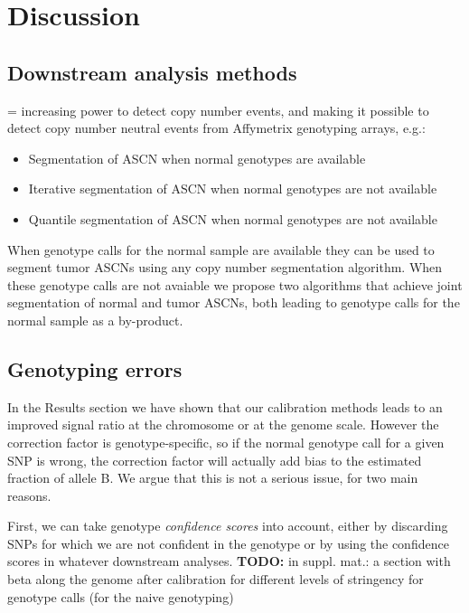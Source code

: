 \documentclass[10pt]{bmc_article}
\newenvironment{bmcformat}{\fussy\setboolean{publ}{true}}{\fussy}
\newenvironment{TODO}{\color{red}\textbf{TODO:}}{}
\begin{document}
\begin{bmcformat}
\section*{Discussion}

\subsection*{Downstream analysis methods}
= increasing power to detect copy number events, and making it possible to detect copy number neutral events from Affymetrix genotyping arrays, e.g.: 
\begin{itemize}
\item Segmentation of ASCN when normal genotypes are available
\item Iterative segmentation of ASCN when normal genotypes are not available
\item Quantile segmentation of ASCN when normal genotypes are not available
\end{itemize}

 When genotype calls for the normal sample are available they can be used to segment tumor ASCNs using any copy number segmentation algorithm. When these genotype calls are not avaiable we propose two algorithms that achieve joint segmentation of normal and tumor ASCNs, both leading to genotype calls for the normal sample as a by-product.\\

\subsection*{Genotyping errors}
In the Results section we have shown that our calibration methods leads to an improved signal ratio at the chromosome or at the genome scale. However the correction factor is genotype-specific, so if the normal genotype call for a given SNP is wrong, the correction factor will actually add bias to the estimated fraction of allele B. We argue that this is not a serious issue, for two main reasons.

First, we can take genotype \emph{confidence scores} into account, either by discarding SNPs for which we are not confident in the genotype or by  using the confidence scores in whatever downstream analyses. 
\begin{TODO}
  in suppl. mat.: a section with beta along the genome after calibration for different levels of stringency for genotype calls (for the naive genotyping)
\end{TODO}


\end{bmcformat}
\end{document}
